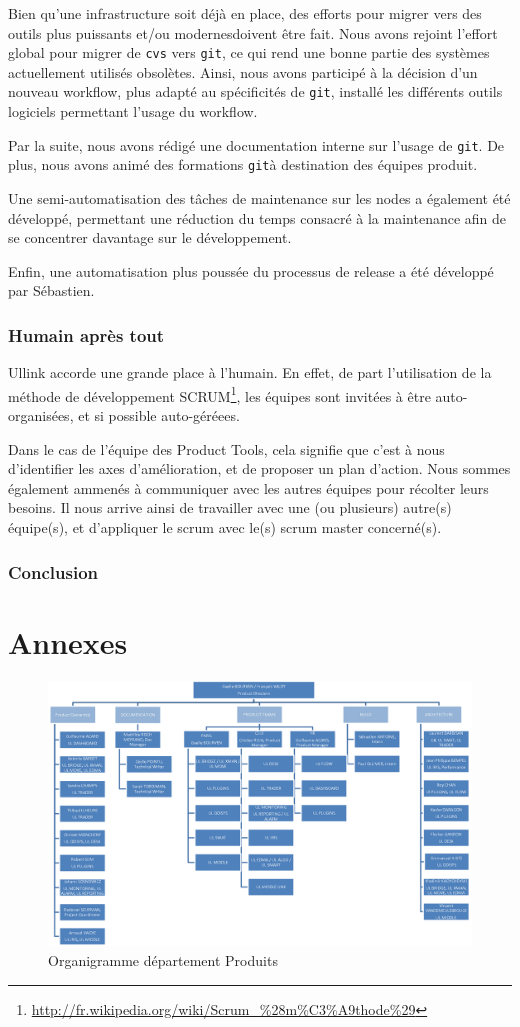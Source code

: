 \documentclass[a4paper, 12pt]{article}
\newcommand{\git}{\texttt{git}}
\begin{document}
Bien qu'une infrastructure soit déjà en place, des efforts pour migrer vers des outils plus puissants et/ou modernesdoivent être fait. Nous avons rejoint l'effort global pour migrer de \texttt{cvs} vers \git, ce qui rend une bonne partie des systèmes actuellement utilisés obsolètes. Ainsi, nous avons participé à la décision d'un nouveau workflow, plus adapté au spécificités de \git, installé les différents outils logiciels permettant l'usage du workflow.

Par la suite, nous avons rédigé une documentation interne sur l'usage de \git. De plus, nous avons animé des formations \git à destination des équipes produit.

Une semi-automatisation des tâches de maintenance sur les nodes a également été développé, permettant une réduction du temps consacré à la maintenance afin de se concentrer davantage sur le développement.

Enfin, une automatisation plus poussée du processus de release a été développé par Sébastien.

\section{Humain après tout}

Ullink accorde une grande place à l'humain. En effet, de part l'utilisation de la méthode de développement SCRUM\footnote{\url{http://fr.wikipedia.org/wiki/Scrum_\%28m\%C3\%A9thode\%29}}, les équipes sont invitées à être auto-organisées, et si possible auto-géréees.

Dans le cas de l'équipe des Product Tools, cela signifie que c'est à nous d'identifier les axes d'amélioration, et de proposer un plan d'action. Nous sommes également ammenés à communiquer avec les autres équipes pour récolter leurs besoins. Il nous arrive ainsi de travailler avec une (ou plusieurs) autre(s) équipe(s), et d'appliquer le scrum avec le(s) scrum master concerné(s).

\section*{Conclusion}

\pagebreak
\part*{Annexes}
\begin{figure}[!h]
\includegraphics[width=525pt, angle=90]{dep_product_orga.png}
\caption{Organigramme département Produits}
\label{Product_dpts_orga}
\end{figure}
\pagebreak

\end{document}
